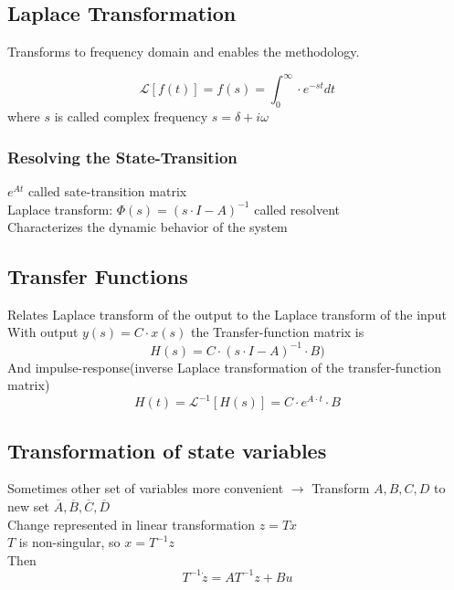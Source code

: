 \subsection{Laplace Transformation}%
\label{dls:sub:laplace_transformation}
Transforms to frequency domain and enables the methodology.

\[\mathcal{L}[f(t)] = f(s) = \int_0^\infty \cdot e^{-st}dt\]
where \(s\) is called complex frequency \(s = \delta + i\omega\)

\subsubsection{Resolving the State-Transition}%
\label{dls:ssub:resolving_the_state_transition}
\(e^{At}\) called sate-transition matrix\\
Laplace transform: \(\Phi(s) = {(s \cdot I - A)}^{-1}\) called resolvent\\
Characterizes the dynamic behavior of the system

\subsection{Transfer Functions}%
\label{dls:sub:transfer_functions}
Relates Laplace transform of the output to the Laplace transform of the input\\
With output \(y(s) = C \cdot x(s)\)  the Transfer-function matrix is
\[H(s) = C \cdot {(s \cdot I - A)}^{-1} \cdot B)\]
And impulse-response(inverse Laplace transformation of the transfer-function matrix)
\[H(t) = \mathcal{L}^{-1} [H(s)] = C \cdot e^{A \cdot t} \cdot B\]

\subsection{Transformation of state variables}%
\label{dls:sub:transformation_of_state_variables}
Sometimes other set of variables more convenient
\(\rightarrow\) Transform \(A, B, C, D\) to new set \(\overline{A}, \overline{B}, \overline{C}, \overline{D}\)\\
Change represented in linear transformation \(z=Tx\)\\
\(T\) is non-singular, so \(x = T^{-1}z\)\\
Then \[T^{-1}\dot{z} = AT^{-1}z + Bu\]